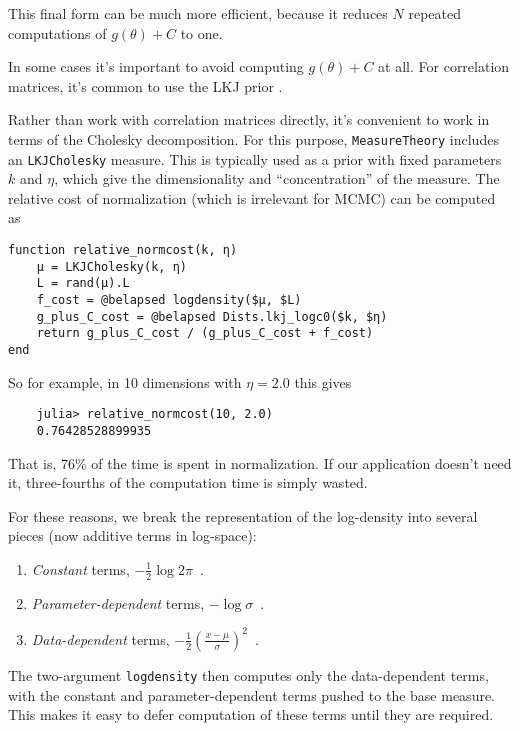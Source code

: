 \documentclass{juliacon}
\begin{document}
This final form can be much more efficient, because it reduces $N$ repeated computations of $g(\theta) + C$ to one. 

In some cases it's important to avoid computing $g(\theta) + C$ at all. For correlation matrices, it's common to use the LKJ prior \cite{LEWANDOWSKI20091989}. 

Rather than work with correlation matrices directly, it's convenient to work in terms of the Cholesky decomposition. For this purpose, \verb|MeasureTheory| includes an \verb|LKJCholesky| measure. This is typically used as a prior with fixed parameters $k$ and $\eta$, which give the dimensionality and ``concentration'' of the measure. The relative cost of normalization (which is irrelevant for MCMC) can be computed as

\begin{verbatim}
function relative_normcost(k, η)
    μ = LKJCholesky(k, η)
    L = rand(μ).L
    f_cost = @belapsed logdensity($μ, $L)
    g_plus_C_cost = @belapsed Dists.lkj_logc0($k, $η)
    return g_plus_C_cost / (g_plus_C_cost + f_cost)
end
\end{verbatim}

So for example, in 10 dimensions with $\eta=2.0$ this gives
\begin{verbatim}
    julia> relative_normcost(10, 2.0)
    0.76428528899935    
\end{verbatim}

That is, 76\% of the time is spent in normalization. If our application doesn't need it, three-fourths of the computation time is simply wasted.

For these reasons, we break the representation of the log-density into several pieces (now additive terms in log-space):
\begin{enumerate}
    \item \emph{Constant} terms,  $-\frac{1}{2}\log 2\pi$\ .
    \item \emph{Parameter-dependent} terms,  $-\log \sigma$\ .
    \item \emph{Data-dependent} terms, $-\frac{1}{2}\left(\frac{x - \mu}{\sigma}\right)^2$\ .
\end{enumerate}

The two-argument \verb|logdensity| then computes only the data-dependent terms, with the constant and parameter-dependent terms pushed to the base measure. This makes it easy to defer computation of these terms until they are required.


\end{document}

